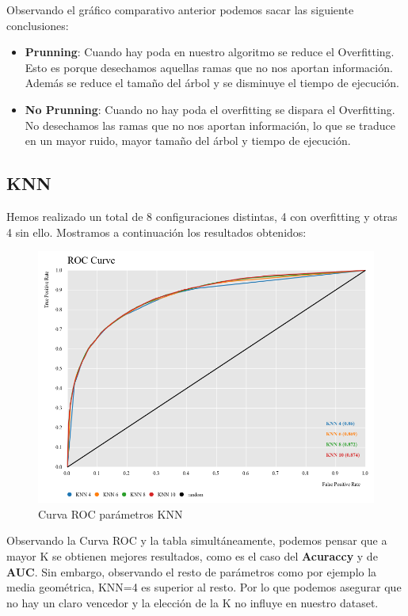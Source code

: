 	\newpage
	Observando el gráfico comparativo anterior podemos sacar las siguiente conclusiones:
	\begin{itemize}
		\item \textbf{Prunning}: Cuando hay poda en nuestro algoritmo se reduce el Overfitting. Esto es porque desechamos aquellas ramas que no nos aportan información. Además se reduce el tamaño del árbol y se disminuye el tiempo de ejecución.
		
		\item \textbf{No Prunning}: Cuando no hay poda el overfitting se dispara el Overfitting. No desechamos las ramas que no nos aportan información, lo que se traduce en un mayor ruido, mayor tamaño del árbol y tiempo de ejecución.
	\end{itemize}



	\subsection{KNN}
	
	\hspace{1cm} Hemos realizado un total de 8 configuraciones distintas, 4 con overfitting y otras 4 sin ello.
	Mostramos a continuación los resultados obtenidos:
	
	\begin{figure}[H]
		\centering
		\includegraphics[width=1\textwidth]{img/rocknn.png}
		\caption{Curva ROC parámetros KNN}
	\end{figure}
	
	
	Observando la Curva ROC y la tabla simultáneamente, podemos pensar que a mayor K se obtienen mejores resultados, como es el caso del \textbf{Acuraccy} y de \textbf{AUC}. Sin embargo, observando el resto de parámetros como por ejemplo la media geométrica, KNN=4 es superior al resto. Por lo que podemos asegurar que no hay un claro vencedor y la elección de la K no influye en nuestro dataset.
	
